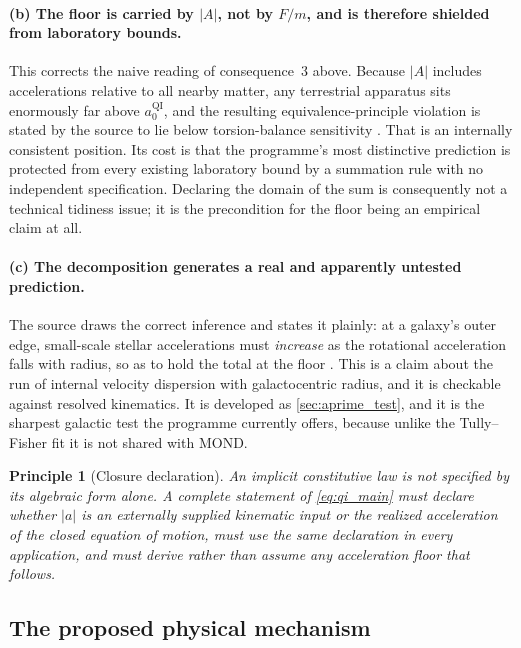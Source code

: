 \documentclass[11pt]{article}
\newtheorem{principle}{Principle}
\newcommand{\QI}{\mathrm{QI}}
\begin{document}
\paragraph{(b) The floor is carried by \(|A|\), not by \(F/m\), and is therefore shielded from laboratory bounds.} This corrects the naive reading of consequence~3 above. Because \(|A|\) includes accelerations relative to all nearby matter, any terrestrial apparatus sits enormously far above \(a_{0}^{\QI}\), and the resulting equivalence-principle violation is stated by the source to lie below torsion-balance sensitivity \cite{McCulloch2011Tajmar}. That is an internally consistent position. Its cost is that the programme's most distinctive prediction is protected from every existing laboratory bound by a summation rule with no independent specification. Declaring the domain of the sum is consequently not a technical tidiness issue; it is the precondition for the floor being an empirical claim at all.

\paragraph{(c) The decomposition generates a real and apparently untested prediction.} The source draws the correct inference and states it plainly: at a galaxy's outer edge, small-scale stellar accelerations must \emph{increase} as the rotational acceleration falls with radius, so as to hold the total at the floor \cite{McCulloch2012}. This is a claim about the run of internal velocity dispersion with galactocentric radius, and it is checkable against resolved kinematics. It is developed as \cref{sec:aprime_test}, and it is the sharpest galactic test the programme currently offers, because unlike the Tully--Fisher fit it is not shared with MOND.

\begin{principle}[Closure declaration]
An implicit constitutive law is not specified by its algebraic form alone. A complete statement of \cref{eq:qi_main} must declare whether \(|a|\) is an externally supplied kinematic input or the realized acceleration of the closed equation of motion, must use the same declaration in every application, and must derive rather than assume any acceleration floor that follows.
\label{prin:closure}
\end{principle}

\subsection{The proposed physical mechanism}
\end{document}
